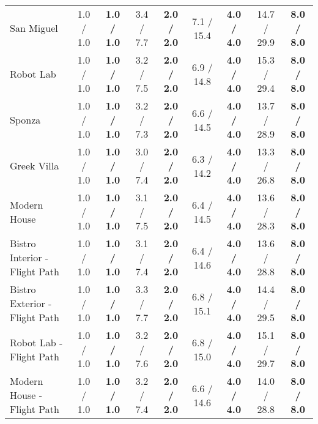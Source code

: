 \begin{table*}[t]
\begin{tabular}{l cc|cc|cc|cc}
            		San Miguel                    & 1.0 / 1.0            & \textbf{1.0 / 1.0}          & 3.4 / 7.7            & \textbf{2.0 / 2.0}          & 7.1 / 15.4           & \textbf{4.0 / 4.0}          & 14.7 / 29.9          & \textbf{8.0 / 8.0}          \\
            		Robot Lab                     & 1.0 / 1.0            & \textbf{1.0 / 1.0}          & 3.2 / 7.5            & \textbf{2.0 / 2.0}          & 6.9 / 14.8           & \textbf{4.0 / 4.0}          & 15.3 / 29.4          & \textbf{8.0 / 8.0}          \\
            		Sponza                        & 1.0 / 1.0            & \textbf{1.0 / 1.0}          & 3.2 / 7.3            & \textbf{2.0 / 2.0}          & 6.6 / 14.5           & \textbf{4.0 / 4.0}          & 13.7 / 28.9          & \textbf{8.0 / 8.0}          \\
            		Greek Villa                   & 1.0 / 1.0            & \textbf{1.0 / 1.0}          & 3.0 / 7.4            & \textbf{2.0 / 2.0}          & 6.3 / 14.2           & \textbf{4.0 / 4.0}          & 13.3 / 26.8          & \textbf{8.0 / 8.0}          \\
            		Modern House                  & 1.0 / 1.0            & \textbf{1.0 / 1.0}          & 3.1 / 7.5            & \textbf{2.0 / 2.0}          & 6.4 / 14.5           & \textbf{4.0 / 4.0}          & 13.6 / 28.3          & \textbf{8.0 / 8.0}          \\
            		Bistro Interior - Flight Path & 1.0 / 1.0            & \textbf{1.0 / 1.0}          & 3.1 / 7.4            & \textbf{2.0 / 2.0}          & 6.4 / 14.6           & \textbf{4.0 / 4.0}          & 13.6 / 28.8          & \textbf{8.0 / 8.0}          \\
            		Bistro Exterior - Flight Path & 1.0 / 1.0            & \textbf{1.0 / 1.0}          & 3.3 / 7.7            & \textbf{2.0 / 2.0}          & 6.8 / 15.1           & \textbf{4.0 / 4.0}          & 14.4 / 29.5          & \textbf{8.0 / 8.0}          \\
            		Robot Lab - Flight Path       & 1.0 / 1.0            & \textbf{1.0 / 1.0}          & 3.2 / 7.6            & \textbf{2.0 / 2.0}          & 6.8 / 15.0           & \textbf{4.0 / 4.0}          & 15.1 / 29.7          & \textbf{8.0 / 8.0}          \\
            		Modern House - Flight Path    & 1.0 / 1.0            & \textbf{1.0 / 1.0}          & 3.2 / 7.4            & \textbf{2.0 / 2.0}          & 6.6 / 14.6           & \textbf{4.0 / 4.0}          & 14.0 / 28.8          & \textbf{8.0 / 8.0}          \\

\end{tabular}
\end{table*}
